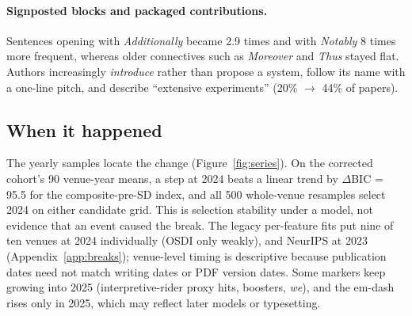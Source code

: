 \documentclass[10pt,twocolumn]{article}
\begin{document}
\paragraph{Signposted blocks and packaged contributions.} Sentences opening with \textit{Additionally} became 2.9 times and with \textit{Notably} 8 times more frequent, whereas older connectives such as \textit{Moreover} and \textit{Thus} stayed flat. Authors increasingly \textit{introduce} rather than propose a system, follow its name with a one-line pitch, and describe ``extensive experiments'' (20\% $\to$ 44\% of papers).

\begin{table}[t]
\centering\footnotesize
\resizebox{\columnwidth}{!}{}
\caption{Share (\%) of plain-or-elevated occurrences that use the elevated variant, averaged over venues; ``non-LLM'': 2024--26 papers that are not LLM-centred.}
\label{tab:synonyms}
\end{table}

\begin{table}[t]
\centering\small

\caption{Readability, voice, packaging and citations from the original v3 result files, pooled over ten venues (columns as in Table~\ref{tab:main}; Jump is the legacy feature-level trend coefficient in SD units). The last row is a trend that is partly topic: arXiv citations were already rising before 2020.}
\label{tab:second}
\end{table}

\subsection{When it happened}

The yearly samples locate the change (Figure~\ref{fig:series}). On the corrected cohort's 90 venue-year means, a step at 2024 beats a linear trend by $\Delta$BIC = 95.5 for the composite-pre-SD index, and all 500 whole-venue resamples select 2024 on either candidate grid. This is selection stability under a model, not evidence that an event caused the break. The legacy per-feature fits put nine of ten venues at 2024 individually (OSDI only weakly), and NeurIPS at 2023 (Appendix~\ref{app:breaks}); venue-level timing is descriptive because publication dates need not match writing dates or PDF version dates. Some markers keep growing into 2025 (interpretive-rider proxy hits, boosters, \textit{we}), and the em-dash rises only in 2025, which may reflect later models or typesetting.
\end{document}
